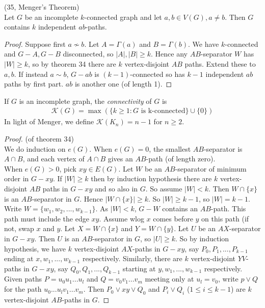 \documentclass[a4paper]{article}
\begin{document}
\begin{coro} (35, Menger's Theorem)\\
Let $G$ be an incomplete $k$-connected graph and let $a,b \in V(G), a \neq b$. Then $G$ contains $k$ independent $ab$-paths.
\begin{proof}
Suppose first $a \not\sim b$. Let $A = \Gamma(a)$ and $B = \Gamma(b)$. We have $k$-connected and $G-A,G-B$ disconnected, so $|A|,|B| \geq k$. Hence any $AB$-separator $W$ has $|W| \geq k$, so by theorem 34 there are $k$ vertex-disjoint $AB$ paths. Extend these to $a,b$. If instead $a \sim b$, $G-ab$ is $(k-1)$-connected so has $k-1$ independent $ab$ paths by first part. $ab$ is another one (of length 1).
\end{proof}
\end{coro}

\begin{defi}
If $G$ is an incomplete graph, the \emph{connectivity} of $G$ is
\begin{equation*}
\begin{aligned}
\mathcal{K}(G) = \max(\{k \geq 1: G \text{ is k-connected} \} \cup \{0\})
\end{aligned}
\end{equation*}
In light of Menger, we define $\mathcal{K}(K_n) = n-1$ for $n \geq 2$.
\end{defi}

\begin{proof} (of theorem 34)\\
We do induction on $e(G)$. When $e(G) =0$, the smallest $AB$-separator is $A \cap B$, and each vertex of $A \cap B$ gives an $AB$-path (of length zero).\\
When $e(G) > 0$, pick $xy \in E(G)$. Let $W$ be an $AB$-separator of minimum order in $G-xy$. If $|W| \geq k$ then by induction hypothesis there are $k$ vertex-disjoint $AB$ paths in $G-xy$ and so also in $G$. So assume $|W| < k$. Then $W \cap \{x\}$ is an $AB$-separator in $G$. Hence $|W \cap \{x\} | \geq k$. So $|W| \geq k-1$, so $|W| = k-1$. Write $W = \{w_1,w_2,...,w_{k-1}\}$. As $|W| < k$, $G-W$ contains an $AB$-path. This path must include the edge $xy$. Assume wlog $x$ comes before $y$ on this path (if not, swap $x$ and $y$. Let $X = W \cap \{x\}$ and $Y = W \cap \{y\}$. Let $U$ be an $AX$-separator in $G-xy$. Then $U$ is an $AB$-separator in $G$, so $|U| \geq k$. So by induction hypothesis, we have $k$ vertex-disjoint $AX$-paths in $G-xy$, say $P_0,P_1,...,P_{k-1}$ ending at $x,w_1,...,w_{k-1}$ respectively. Similarly, there are $k$ vertex-disjoint $YV$-paths in $G-xy$, say $Q_0,Q_1,...,Q_{k-1}$ starting at $y,w_1,...,w_{k-1}$ respectively. Given paths $P=u_0u_1...u_l$ and $Q = v_0v_1...v_m$ meeting only at $u_l = v_0$, write $p \vee Q$ for the path $u_0...u_l v_1...v_m$. Then $P_0 \vee xy \vee Q_0$ and $P_i \vee Q_i$ ($1 \leq i \leq k-1$) are $k$ vertex-disjoint $AB$-paths in $G$.
\end{proof}
\end{document}

